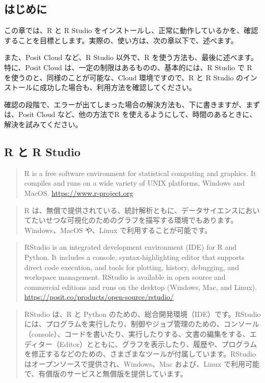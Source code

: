 \documentclass[
]{bxjsbook}
\theoremstyle{definition}
\theoremstyle{definition}
\theoremstyle{definition}
\theoremstyle{definition}
\theoremstyle{remark}
\begin{document}
\hypertarget{ux306fux3058ux3081ux306b}{%
\subsection{はじめに}\label{ux306fux3058ux3081ux306b}}

この章では、R と R Studio をインストールし、正常に動作しているかを、確認することを目標とします。実際の、使い方は、次の章以下で、述べます。

また、Posit Cloud など、R Studio 以外で、R を使う方法も、最後に述べます。特に、Posit Cloud は、一定の制限はあるものの、基本的には、R Studio で R を使うのと、同様のことが可能な、Cloud 環境ですので、R と R Studio のインストールに成功した場合も、利用方法を確認してください。

確認の段階で、エラーが出てしまった場合の解決方法も、下に書きますが、まずは、Posit Cloud など、他の方法でR を使えるようにして、時間のあるときに、解決を試みてください。

\hypertarget{r-ux3068-r-studio}{%
\subsection{R と R Studio}\label{r-ux3068-r-studio}}

\begin{quote}
R is a free software environment for statistical computing and graphics. It compiles and runs on a wide variety of UNIX platforms, Windows and MacOS. \url{https://www.r-project.org}
\end{quote}

\begin{quote}
R は、無償で提供されている、統計解析ともに、データサイエンスにおいてたいせつな可視化のためのグラフを描写する環境でもあります。Windows、MacOS や、Linux で利用することが可能です。
\end{quote}

\begin{quote}
RStudio is an integrated development environment (IDE) for R and Python. It includes a console, syntax-highlighting editor that supports direct code execution, and tools for plotting, history, debugging, and workspace management. RStudio is available in open source and commercial editions and runs on the desktop (Windows, Mac, and Linux).　\url{https://posit.co/products/open-source/rstudio/}
\end{quote}

\begin{quote}
RStudio は、R と Python のための、総合開発環境（IDE）です。RStudio には、プログラムを実行したり、制御やジョブ管理のための、コンソール（console）、コードを書いたり、実行したりする、文書の編集をする、エディター（Editor）とともに、グラフを表示したり、履歴や、プログラムを修正するなどのための、さまざまなツールが付属しています。RStudio はオープンソースで提供され、Windows、Mac および、Linux で利用可能で、有償版のサービスと無償版を提供しています。
\end{quote}
\end{document}
